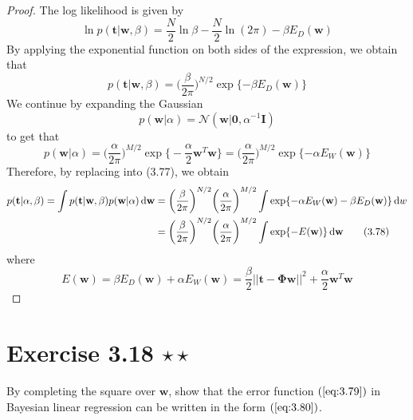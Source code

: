 \begin{proof}
    The log likelihood is given by
    \begin{equation*}
        \ln p(\mathbf{t} | \mathbf{w}, \beta) 
        = \frac{N}{2} \ln \beta - \frac{N}{2} \ln(2\pi) - \beta E_D(\mathbf{w})
        \tag{3.11}\label{eq:3.11}
    \end{equation*}
    By applying the exponential function on both sides of the expression, we obtain that
    \[
        p(\mathbf{t} | \mathbf{w}, \beta) 
        = \bigg(\frac{\beta}{2\pi}\bigg)^{N/2} \exp \{-\beta E_D(\mathbf{w})\}
    \] 
    We continue by expanding the Gaussian
    \begin{equation*}
        p(\mathbf{w} | \alpha) = \mathcal{N}(\mathbf{w} | \mathbf{0}, \alpha^{-1} \mathbf{I})
        \tag{3.52}\label{eq:3.52}
    \end{equation*}
    to get that
    \[
        p(\mathbf{w} | \alpha) 
        = \bigg(\frac{\alpha}{2\pi}\bigg)^{M / 2} 
            \exp\bigg\{-\frac{\alpha}{2} \mathbf{w}^T\mathbf{w}\bigg\}
        = \bigg(\frac{\alpha}{2\pi}\bigg)^{M / 2}  \exp\{-\alpha E_W(\mathbf{w})\}
    \] 
    Therefore, by replacing into (3.77), we obtain
    \begin{align*}
        p(\mathbf{t} | \alpha, \beta)
        = \int p(\mathbf{t} | \mathbf{w}, \beta) p(\mathbf{w} | \alpha) \mathop{}\!\mathrm{d} \mathbf{w}
        &= \bigg(\frac{\beta}{2\pi}\bigg)^{N/2} \bigg(\frac{\alpha}{2\pi}\bigg)^{M/2}
        \int \exp\{-\alpha E_W(\mathbf{w}) - \beta E_D(\mathbf{w})\} \mathop{}\!\mathrm{d} w \\
        &= \bigg(\frac{\beta}{2\pi}\bigg)^{N/2} \bigg(\frac{\alpha}{2\pi}\bigg)^{M/2}
        \int \exp\{-E(\mathbf{w})\} \mathop{}\!\mathrm{d} \mathbf{w} \label{eq:3.78} \tag{3.78}
    \end{align*}
    where
    \begin{equation*}
        E(\mathbf{w}) 
        = \beta E_D(\mathbf{w}) + \alpha E_W(\mathbf{w})
        = \frac{\beta}{2} ||\mathbf{t} - \mathbf{\Phi}\mathbf{w}||^2 
        + \frac{\alpha}{2} \mathbf{w}^T\mathbf{w}
        \tag{3.79}\label{eq:3.79}
    \end{equation*}
\end{proof}

\section*{Exercise 3.18 $\star \star$}
By completing the square over $\mathbf{w}$, show that the error function
$(\ref{eq:3.79})$ in Bayesian linear regression can be written in the form
$(\ref{eq:3.80})$.

